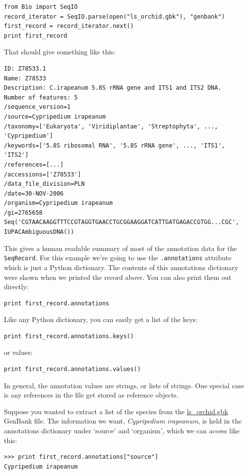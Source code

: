 \documentclass{report}
\begin{document}
\begin{verbatim}
from Bio import SeqIO
record_iterator = SeqIO.parse(open("ls_orchid.gbk"), "genbank")
first_record = record_iterator.next()
print first_record
\end{verbatim}

\noindent That should give something like this:

\begin{verbatim}
ID: Z78533.1
Name: Z78533
Description: C.irapeanum 5.8S rRNA gene and ITS1 and ITS2 DNA.
Number of features: 5
/sequence_version=1
/source=Cypripedium irapeanum
/taxonomy=['Eukaryota', 'Viridiplantae', 'Streptophyta', ..., 'Cypripedium']
/keywords=['5.8S ribosomal RNA', '5.8S rRNA gene', ..., 'ITS1', 'ITS2']
/references=[...]
/accessions=['Z78533']
/data_file_division=PLN
/date=30-NOV-2006
/organism=Cypripedium irapeanum
/gi=2765658
Seq('CGTAACAAGGTTTCCGTAGGTGAACCTGCGGAAGGATCATTGATGAGACCGTGG...CGC', IUPACAmbiguousDNA())
\end{verbatim}

This gives a human readable summary of most of the annotation data for the \verb|SeqRecord|.
For this example we're going to use the \verb|.annotations| attribute which is just a Python dictionary.
The contents of this annotations dictionary were shown when we printed the record above.
You can also print them out directly:
\begin{verbatim}
print first_record.annotations
\end{verbatim}
\noindent Like any Python dictionary, you can easily get a list of the keys:
\begin{verbatim}
print first_record.annotations.keys()
\end{verbatim}
\noindent or values:
\begin{verbatim}
print first_record.annotations.values()
\end{verbatim}

In general, the annotation values are strings, or lists of strings.  One special case is any references in the file get stored as reference objects.  

Suppose you wanted to extract a list of the species from the \href{http://biopython.org/DIST/docs/tutorial/examples/ls_orchid.gbk}{ls\_orchid.gbk} GenBank file.  The information we want, \emph{Cypripedium irapeanum}, is held in the annotations dictionary under `source' and `organism', which we can access like this:

\begin{verbatim}
>>> print first_record.annotations["source"]
Cypripedium irapeanum
\end{verbatim}
\end{document}
